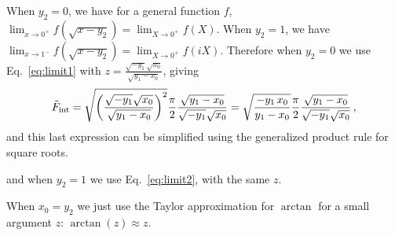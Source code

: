 \documentclass[twoside]{article}
\begin{document}
When $y_2 = 0$, we have for a general function $f$, $\lim_{x \to 0^+} f(\sqrt{x-y_2}) = \lim_{X \to 0^+} f(X)$. 
When $y_2 = 1$, we have $\lim_{x \to 1^-} f(\sqrt{x-y_2}) = \lim_{X \to 0^+} f(i X)$. 
Therefore when $y_2 = 0$ we use Eq.~\eqref{eq:limit1} with $z = \frac{\sqrt{-y_1} \sqrt{x_0}}{\sqrt{y_1-x_0}}$, giving 
\begin{equation}
\tilde{F}_{\rm int} = \sqrt{\left(\frac{\sqrt{-y_1} \sqrt{x_0}}{\sqrt{y_1-x_0}}\right)^2}\frac{\pi}{2}\frac{\sqrt{y_1-x_0}}{\sqrt{-y_1} \sqrt{x_0}}= \sqrt{\frac{-y_1\, x_0}{y_1-x_0}}\frac{\pi}{2}\frac{\sqrt{y_1-x_0}}{\sqrt{-y_1} \sqrt{x_0}}\,,
\end{equation}
and this last expression can be simplified using the generalized product rule for square roots.



 and when $y_2 = 1$ we use Eq.~\eqref{eq:limit2}, with the same $z$.

When $x_0 = y_2$ we just use the Taylor approximation for $\arctan$ for a small argument $z$: $\arctan(z) \approx z$.
\end{document}

